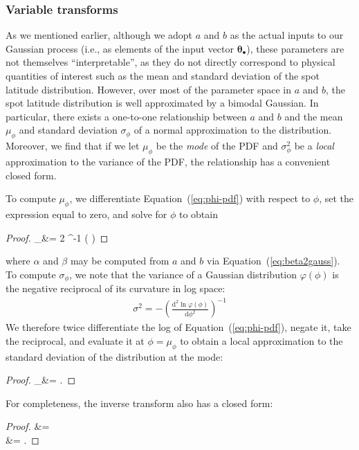 \documentclass[modern]{aastex62}
\begin{document}
\subsubsection{Variable transforms}
\label{sec:lat-transform}

As we mentioned earlier,
although we adopt $a$ and $b$ as the actual inputs to our Gaussian process
(i.e., as elements of the input vector $\pmb{\theta}_\bullet$), these
parameters are not themselves ``interpretable'', as they do not directly
correspond to physical
quantities of interest such as the mean and standard deviation of the spot
latitude distribution. However, over most of the parameter space in $a$ and $b$,
the spot latitude distribution is well approximated
by a bimodal Gaussian. In particular, there exists
a one-to-one relationship between $a$ and $b$ and the mean $\mu_\phi$
and standard deviation $\sigma_\phi$ of a normal approximation to the
distribution. Moreover, we find that
if we let $\mu_\phi$ be the \emph{mode} of the PDF and
$\sigma_\phi^2$ be a \emph{local} approximation to the variance of the PDF,
the relationship has a convenient closed form.

To compute $\mu_\phi$, we differentiate Equation~(\ref{eq:phi-pdf}) with respect
to $\phi$, set the expression equal to zero, and solve
for $\phi$ to obtain
%
\begin{proof}{}
    \mu_\phi &= 2 \tan^{-1}
    \left(
    \right)
\end{proof}
%
where $\alpha$ and $\beta$ may be computed from $a$ and $b$ via
Equation~(\ref{eq:beta2gauss}).
%
To compute $\sigma_\phi$, we note that the variance of a Gaussian distribution
$\varphi(\phi)$
is the negative reciprocal of its curvature in log space:
%
\begin{align}
    \sigma^2 = -\left(\frac{\mathrm{d}^2 \ln \varphi(\phi)}{\mathrm{d}\phi^2}\right)^{-1}
\end{align}
%
We therefore twice differentiate the log of Equation~(\ref{eq:phi-pdf}), negate it,
take the reciprocal, and evaluate it at $\phi = \mu_\phi$ to obtain a local
approximation to the standard deviation of the distribution at the mode:
%
\begin{proof}{}
    \sigma_\phi &= 
    \quad.
\end{proof}
%
For completeness, the inverse transform also has a closed form:
%
\begin{proof}{}
    \alpha &=  \\
    \beta &= 
    \quad.
\end{proof}
\end{document}
